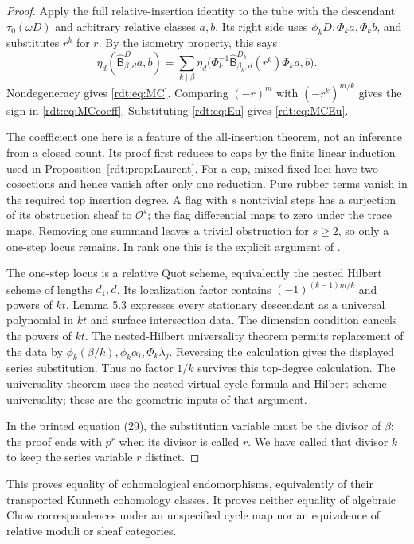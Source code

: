 \begin{proof}
Apply the full relative-insertion identity
\cite[Theorem 5.1]{OberdieckMC} to the tube with the descendant
$\tau_0(\omega D)$ and arbitrary relative classes $a,b$. Its right
side uses $\phi_kD,\Phi_ka,\Phi_kb$, and substitutes $r^k$ for $r$.
By the isometry property, this says
\[
 \eta_d(\widehat{\mathsf B}^D_{\beta,d}a,b)
 =\sum_{k\mid\beta}
   \eta_d\bigl(\Phi_k^{-1}\widehat{\mathsf B}^{D_k}_{\beta_k,d}(r^k)\Phi_ka,b\bigr).
\]
Nondegeneracy gives \eqref{rdt:eq:MC}. Comparing $(-r)^m$ with
$(-r^k)^{m/k}$ gives the sign in \eqref{rdt:eq:MCcoeff}.
Substituting \eqref{rdt:eq:Eu} gives \eqref{rdt:eq:MCEu}.

The coefficient one here is a feature of the all-insertion theorem,
not an inference from a closed count. Its proof first reduces to caps
by the finite linear induction used in
Proposition~\ref{rdt:prop:Laurent}. For a cap, mixed fixed loci have
two cosections and hence vanish after only one reduction. Pure rubber
terms vanish in the required top insertion degree. A flag with $s$
nontrivial steps has a surjection of its obstruction sheaf to
$\mathcal O^s$; the flag differential maps to zero under the trace
maps. Removing one summand leaves a trivial obstruction for $s\ge2$,
so only a one-step locus remains. In rank one this is the explicit
argument of \cite[Proposition 4.8]{OberdieckMC}.

The one-step locus is a relative Quot scheme, equivalently the nested
Hilbert scheme of lengths $d_1,d$. Its localization factor contains
$(-1)^{(k-1)m/k}$ and powers of $kt$. Lemma 5.3 expresses every
stationary descendant as a universal polynomial in $kt$ and surface
intersection data. The dimension condition cancels the powers of
$kt$. The nested-Hilbert universality theorem
\cite[Theorem 3.2]{OberdieckMC} permits replacement of the data by
$\phi_k(\beta/k),\phi_k\alpha_i,\Phi_k\lambda_j$. Reversing the
calculation gives the displayed series substitution. Thus no factor
$1/k$ survives this top-degree calculation. The universality theorem
uses the nested virtual-cycle formula and Hilbert-scheme universality;
these are the geometric inputs of that argument.

In the printed equation (29), the substitution variable must be the
divisor of $\beta$: the proof ends with $p^r$ when its divisor is
called $r$. We have called that divisor $k$ to keep the series
variable $r$ distinct.
\end{proof}

This proves equality of cohomological endomorphisms, equivalently of
their transported Kunneth cohomology classes. It proves neither
equality of algebraic Chow correspondences under an unspecified
cycle map nor an equivalence of relative moduli or sheaf categories.

